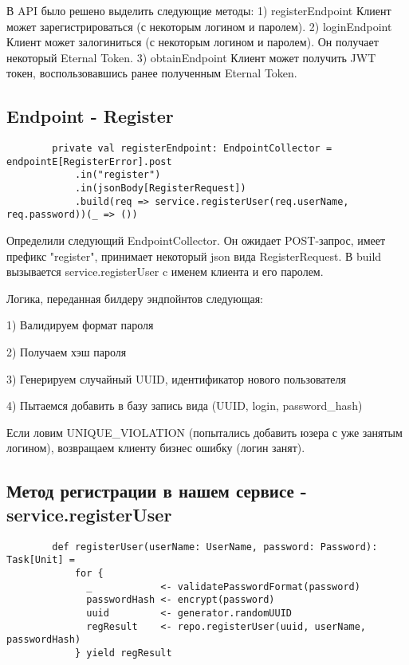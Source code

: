 \documentclass[14pt]{extarticle}
\begin{document}
    В API было решено выделить следующие методы:
    1) registerEndpoint
    Клиент может зарегистрироваться (с некоторым логином и паролем).
    2) loginEndpoint
    Клиент может залогиниться (с некоторым логином и паролем).
    Он получает некоторый Eternal Token.
    3) obtainEndpoint
    Клиент может получить JWT токен, воспользовавшись ранее полученным Eternal Token.

    \subsection{Endpoint - Register}

    \begin{verbatim}
        private val registerEndpoint: EndpointCollector = endpointE[RegisterError].post
            .in("register")
            .in(jsonBody[RegisterRequest])
            .build(req => service.registerUser(req.userName, req.password))(_ => ())
    \end{verbatim}

    Определили следующий EndpointCollector.
    Он ожидает POST-запрос, имеет префикс "register", принимает некоторый json вида RegisterRequest.
    В build вызывается service.registerUser c именем клиента и его паролем.

    Логика, переданная билдеру эндпойнтов следующая:

    1) Валидируем формат пароля

    2) Получаем хэш пароля

    3) Генерируем случайный UUID, идентификатор нового пользователя

    4) Пытаемся добавить в базу запись вида (UUID, login, password\_hash)

    Если ловим UNIQUE\_VIOLATION (попытались добавить юзера с уже занятым логином),
    возвращаем клиенту бизнес ошибку (логин занят).

    \subsection{Метод регистрации в нашем сервисе - service.registerUser}
    \begin{verbatim}
        def registerUser(userName: UserName, password: Password): Task[Unit] =
            for {
              _            <- validatePasswordFormat(password)
              passwordHash <- encrypt(password)
              uuid         <- generator.randomUUID
              regResult    <- repo.registerUser(uuid, userName, passwordHash)
            } yield regResult
    \end{verbatim}
\end{document}
